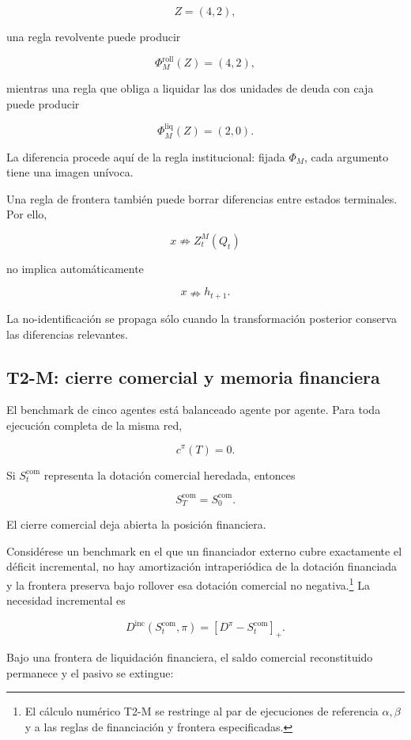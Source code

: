 \documentclass[10pt,a5paper,twoside]{article}
\begin{document}
\[
Z=(4,2),
\]

una regla revolvente puede producir

\[
\Phi_M^{\mathrm{roll}}(Z)=(4,2),
\]

mientras una regla que obliga a liquidar las dos unidades de deuda con
caja puede producir

\[
\Phi_M^{\mathrm{liq}}(Z)=(2,0).
\]

La diferencia procede aquí de la regla institucional: fijada \(\Phi_M\),
cada argumento tiene una imagen unívoca.

Una regla de frontera también puede borrar diferencias entre estados terminales.
Por ello,

\[
x\nRightarrow Z_t^M(Q_t)
\]

no implica automáticamente

\[
x\nRightarrow h_{t+1}.
\]

La no-identificación se propaga sólo cuando la transformación posterior conserva
las diferencias relevantes.

\subsection{T2-M: cierre comercial y memoria financiera}\label{t2-m-cierre-comercial-y-memoria-financiera}

El benchmark de cinco agentes está balanceado agente por agente. Para
toda ejecución completa de la misma red,

\[
c^\pi(T)=0.
\]

Si \(S_t^{\mathrm{com}}\) representa la dotación comercial heredada,
entonces

\[
S_T^{\mathrm{com}}
=
S_0^{\mathrm{com}}.
\]

El cierre comercial deja abierta la posición financiera.

Considérese un benchmark en el que un financiador externo cubre
exactamente el déficit incremental, no hay amortización intraperiódica
de la dotación financiada y la frontera preserva bajo rollover esa
dotación comercial no negativa.\footnote{El cálculo numérico T2-M se
  restringe al par de ejecuciones de referencia \(\alpha,\beta\) y a las
  reglas de financiación y frontera especificadas.} La necesidad
incremental es

\[
D^{\mathrm{inc}}
(S_t^{\mathrm{com}},\pi)
=
[D^\pi-S_t^{\mathrm{com}}]_+.
\]

Bajo una frontera de liquidación financiera, el saldo comercial
reconstituido permanece y el pasivo se extingue:
\end{document}
